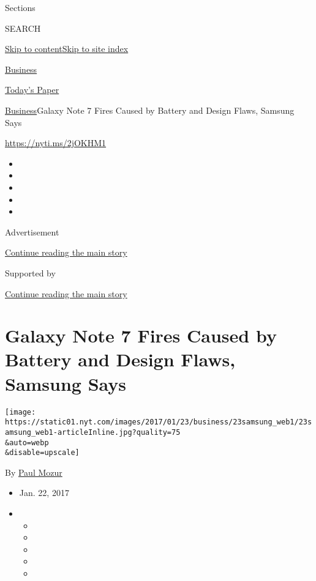 Sections

SEARCH

\protect\hyperlink{site-content}{Skip to
content}\protect\hyperlink{site-index}{Skip to site index}

\href{https://www.nytimes.com/section/business}{Business}

\href{https://myaccount.nytimes.com/auth/login?response_type=cookie\&client_id=vi}{}

\href{https://www.nytimes.com/section/todayspaper}{Today's Paper}

\href{/section/business}{Business}\textbar{}Galaxy Note 7 Fires Caused
by Battery and Design Flaws, Samsung Says

\url{https://nyti.ms/2jOKHM1}

\begin{itemize}
\item
\item
\item
\item
\item
\end{itemize}

Advertisement

\protect\hyperlink{after-top}{Continue reading the main story}

Supported by

\protect\hyperlink{after-sponsor}{Continue reading the main story}

\hypertarget{galaxy-note-7-fires-caused-by-battery-and-design-flaws-samsung-says}{%
\section{Galaxy Note 7 Fires Caused by Battery and Design Flaws, Samsung
Says}\label{galaxy-note-7-fires-caused-by-battery-and-design-flaws-samsung-says}}

\texttt{[image: https://static01.nyt.com/images/2017/01/23/business/23samsung\_web1/23samsung\_web1-articleInline.jpg?quality=75\\\&auto=webp\\\&disable=upscale]}

By \href{https://www.nytimes.com/by/paul-mozur}{Paul Mozur}

\begin{itemize}
\item
  Jan. 22, 2017
\item
  \begin{itemize}
  \item
  \item
  \item
  \item
  \item
  \end{itemize}
\end{itemize}

